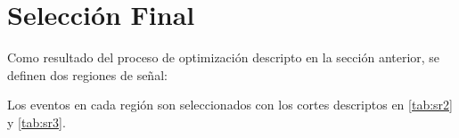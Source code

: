 

\section{Selección Final}\label{sec:signal_regions}

Como resultado del proceso de optimización descripto en la sección anterior,
se definen dos regiones de señal:


Los eventos en cada región son seleccionados con los cortes descriptos en
\cref{tab:sr2} y \cref{tab:sr3}.

